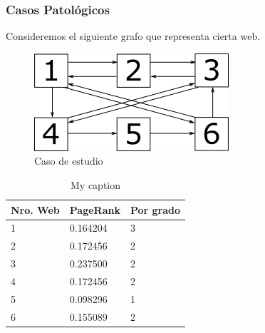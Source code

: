 \subsubsection{Casos Patológicos}

Consideremos el siguiente grafo que representa cierta web.

\begin{figure}[H]
\centering
\includegraphics[scale=0.7]{images/grafo.png}
\caption{Caso de estudio}
\label{casoEst}
\end{figure}

\begin{table}[H]
\centering
\caption{My caption}
\label{my-label}
\begin{tabular}{lll}
\hline
Nro. Web & PageRank & Por grado \\ \hline
1        & 0.164204 & 3         \\
2        & 0.172456 & 2         \\
3        & 0.237500 & 2         \\
4        & 0.172456 & 2         \\
5        & 0.098296 & 1         \\
6        & 0.155089 & 2         \\ \hline
\end{tabular}
\end{table}